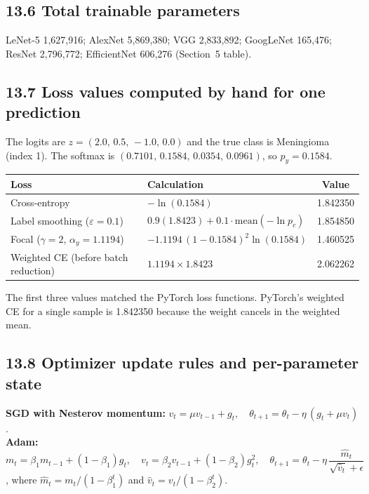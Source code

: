 \documentclass[12pt,a4paper]{article}
\begin{document}
\subsection*{13.6 Total trainable parameters}

LeNet-5 1,627,916; AlexNet 5,869,380; VGG 2,833,892; GoogLeNet 165,476; ResNet 2,796,772;
EfficientNet 606,276 (Section~5 table).

\subsection*{13.7 Loss values computed by hand for one prediction}

The logits are $z=(2.0,\,0.5,\,-1.0,\,0.0)$ and the true class is Meningioma (index 1).
The softmax is $(0.7101,\,0.1584,\,0.0354,\,0.0961)$, so $p_y=0.1584$.

\begin{center}
\renewcommand{\arraystretch}{1.3}\footnotesize
\begin{tabular}{|l|l|c|}
\hline
\textbf{Loss} & \textbf{Calculation} & \textbf{Value} \\ \hline
Cross-entropy & $-\ln(0.1584)$ & 1.842350 \\ \hline
Label smoothing ($\varepsilon=0.1$) & $0.9(1.8423)+0.1\cdot\text{mean}(-\ln p_c)$ & 1.854850 \\ \hline
Focal ($\gamma=2$, $\alpha_y=1.1194$) & $-1.1194\,(1-0.1584)^2\ln(0.1584)$ & 1.460525 \\ \hline
Weighted CE (before batch reduction) & $1.1194\times1.8423$ & 2.062262 \\ \hline
\end{tabular}
\end{center}

The first three values matched the PyTorch loss functions. PyTorch's weighted CE for a single sample is
1.842350 because the weight cancels in the weighted mean.

\subsection*{13.8 Optimizer update rules and per-parameter state}

\textbf{SGD with Nesterov momentum:} $v_t=\mu v_{t-1}+g_t,\quad \theta_{t+1}=\theta_t-\eta\,(g_t+\mu v_t)$.\\
\textbf{Adam:} $m_t=\beta_1 m_{t-1}+(1-\beta_1)g_t,\quad v_t=\beta_2 v_{t-1}+(1-\beta_2)g_t^2,\quad
\theta_{t+1}=\theta_t-\eta\,\dfrac{\hat m_t}{\sqrt{\hat v_t}+\epsilon}$, where
$\hat m_t=m_t/(1-\beta_1^t)$ and $\hat v_t=v_t/(1-\beta_2^t)$.
\end{document}
